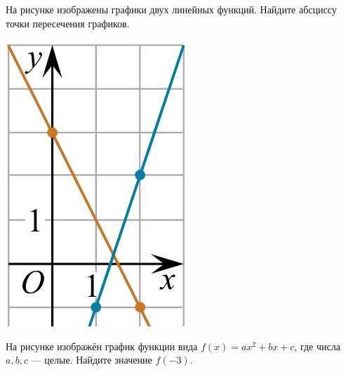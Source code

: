 \begin{class}[number=4]
\begin{listofex}
\begin{minipage}[t]{0.82\textwidth}
			На рисунке изображены графики двух линейных функций. Найдите абсциссу точки пересечения графиков.
		\end{minipage}
		\begin{minipage}[c]{0.13\textwidth}
			\includegraphics[align=t, width=\textwidth]{pics/G101M4C4-2.jpg}
		\end{minipage}
		\item
		\begin{minipage}[t]{0.67\textwidth}
			На рисунке изображён график функции вида \(f(x)=ax^2+bx+c\), где числа \(a, b, c\) --- целые. Найдите значение \(f(-3)\).
		\end{minipage}
		\begin{minipage}[c]{0.25\textwidth}

\end{minipage}
\end{listofex}
\end{class}
